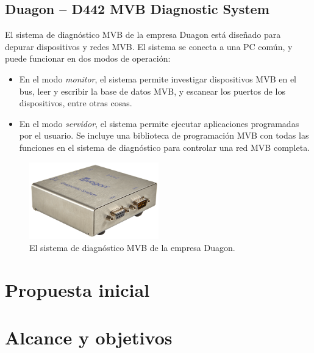 \subsection{Duagon -- D442 MVB Diagnostic System}

El sistema de diagnóstico MVB de la empresa Duagon \cite{duagon} está diseñado para depurar dispositivos y redes MVB. El sistema se conecta a una PC común, y puede funcionar en dos modos de operación:

\begin{itemize}
\item En el modo \emph{monitor}, el sistema permite investigar dispositivos MVB en el bus, leer y escribir la base de datos MVB, y escanear los puertos de los dispositivos, entre otras cosas.
\item En el modo \emph{servidor}, el sistema permite ejecutar aplicaciones programadas por el usuario. Se incluye una biblioteca de programación MVB con todas las funciones en el sistema de diagnóstico para controlar una red MVB completa.
\end{itemize}

\begin{figure}[htbp]
	\centering
	\includegraphics[width=0.5\textwidth]{./Figures/duagon.png}
	\caption[Duagon -- D442 MVB Diagnostic System]{El sistema de diagnóstico MVB de la empresa Duagon.}
\end{figure}


\section{Propuesta inicial}



\section{Alcance y objetivos}
